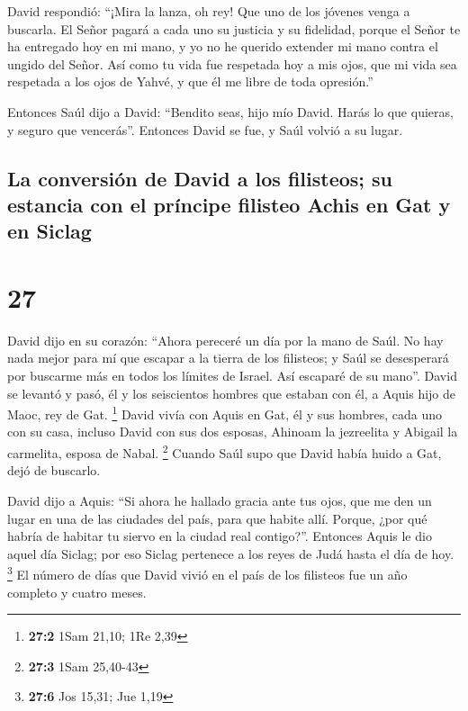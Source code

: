  David respondió: ``¡Mira la lanza, oh rey! Que uno de
los jóvenes venga a buscarla.  El Señor pagará a cada uno
su justicia y su fidelidad, porque el Señor te ha entregado hoy en mi
mano, y yo no he querido extender mi mano contra el ungido del Señor.
 Así como tu vida fue respetada hoy a mis ojos, que mi
vida sea respetada a los ojos de Yahvé, y que él me libre de toda
opresión.''

 Entonces Saúl dijo a David: ``Bendito seas, hijo mío
David. Harás lo que quieras, y seguro que vencerás''. Entonces David se
fue, y Saúl volvió a su lugar.

\hypertarget{la-conversiuxf3n-de-david-a-los-filisteos-su-estancia-con-el-pruxedncipe-filisteo-achis-en-gat-y-en-siclag}{%
\subsection{La conversión de David a los filisteos; su estancia con el
príncipe filisteo Achis en Gat y en
Siclag}\label{la-conversiuxf3n-de-david-a-los-filisteos-su-estancia-con-el-pruxedncipe-filisteo-achis-en-gat-y-en-siclag}}

\hypertarget{section-26}{%
\section{27}\label{section-26}}

 David dijo en su corazón: ``Ahora pereceré un día por la
mano de Saúl. No hay nada mejor para mí que escapar a la tierra de los
filisteos; y Saúl se desesperará por buscarme más en todos los límites
de Israel. Así escaparé de su mano''.  David se levantó y
pasó, él y los seiscientos hombres que estaban con él, a Aquis hijo de
Maoc, rey de Gat. \footnote{\textbf{27:2} 1Sam 21,10; 1Re 2,39}
 David vivía con Aquis en Gat, él y sus hombres, cada uno
con su casa, incluso David con sus dos esposas, Ahinoam la jezreelita y
Abigail la carmelita, esposa de Nabal. \footnote{\textbf{27:3} 1Sam
  25,40-43}  Cuando Saúl supo que David había huido a Gat,
dejó de buscarlo.

 David dijo a Aquis: ``Si ahora he hallado gracia ante tus
ojos, que me den un lugar en una de las ciudades del país, para que
habite allí. Porque, ¿por qué habría de habitar tu siervo en la ciudad
real contigo?''.  Entonces Aquis le dio aquel día Siclag;
por eso Siclag pertenece a los reyes de Judá hasta el día de hoy.
\footnote{\textbf{27:6} Jos 15,31; Jue 1,19}  El número de
días que David vivió en el país de los filisteos fue un año completo y
cuatro meses.

